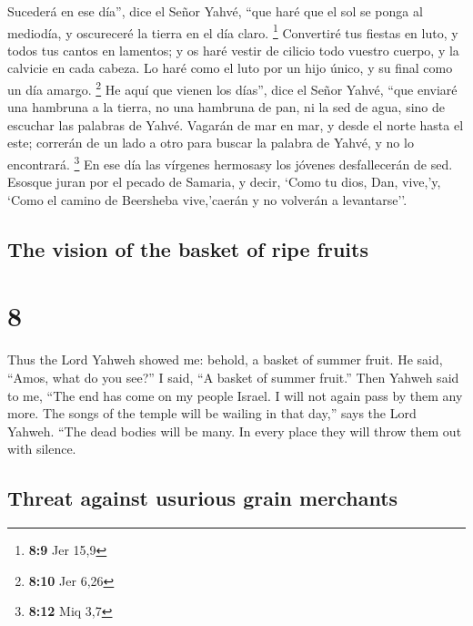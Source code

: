 \begin{paracol}{2}
 Sucederá en ese día'', dice el Señor Yahvé, ``que haré
que el sol se ponga al mediodía, y oscureceré la tierra en el día claro.
\footnote{\textbf{8:9} Jer 15,9}  Convertiré tus fiestas
en luto, y todos tus cantos en lamentos; y os haré vestir de cilicio
todo vuestro cuerpo, y la calvicie en cada cabeza. Lo haré como el luto
por un hijo único, y su final como un día amargo. \footnote{\textbf{8:10}
  Jer 6,26}  He aquí que vienen los días'', dice el Señor
Yahvé, ``que enviaré una hambruna a la tierra, no una hambruna de pan,
ni la sed de agua, sino de escuchar las palabras de Yahvé.
 Vagarán de mar en mar, y desde el norte hasta el este;
correrán de un lado a otro para buscar la palabra de Yahvé, y no lo
encontrará. \footnote{\textbf{8:12} Miq 3,7}  En ese día
las vírgenes hermosasy los jóvenes desfallecerán de sed. 
Esosque juran por el pecado de Samaria, y decir, `Como tu dios, Dan,
vive,'y, `Como el camino de Beersheba vive,'caerán y no volverán a
levantarse''.

\switchcolumn
\begin{otherlanguage}{english}

\hypertarget{the-vision-of-the-basket-of-ripe-fruits}{%
\subsection{The vision of the basket of ripe
fruits}\label{the-vision-of-the-basket-of-ripe-fruits}}

\hypertarget{section-15}{%
\section{8}\label{section-15}}

 Thus the Lord Yahweh showed me: behold, a basket of
summer fruit.  He said, ``Amos, what do you see?'' I said,
``A basket of summer fruit.'' Then Yahweh said to me, ``The end has come
on my people Israel. I will not again pass by them any more.
 The songs of the temple will be wailing in that day,''
says the Lord Yahweh. ``The dead bodies will be many. In every place
they will throw them out with silence.

\hypertarget{threat-against-usurious-grain-merchants}{%
\subsection{Threat against usurious grain
merchants}\label{threat-against-usurious-grain-merchants}}


\end{otherlanguage}
\end{paracol}
